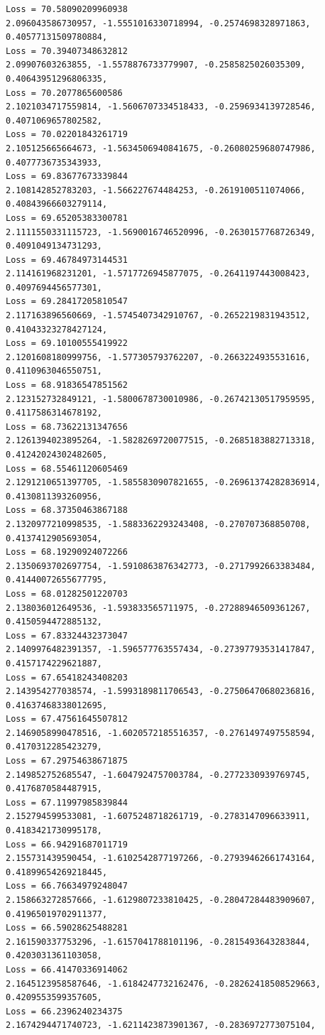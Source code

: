 \documentclass[11pt]{article}
\begin{document}
\begin{Verbatim}[commandchars=\\\{\}]
Loss = 70.58090209960938
2.096043586730957, -1.5551016330718994, -0.2574698328971863,
0.40577131509780884,
Loss = 70.39407348632812
2.09907603263855, -1.5578876733779907, -0.2585825026035309, 0.40643951296806335,
Loss = 70.2077865600586
2.1021034717559814, -1.5606707334518433, -0.2596934139728546,
0.4071069657802582,
Loss = 70.02201843261719
2.105125665664673, -1.5634506940841675, -0.26080259680747986,
0.4077736735343933,
Loss = 69.83677673339844
2.108142852783203, -1.566227674484253, -0.2619100511074066, 0.40843966603279114,
Loss = 69.65205383300781
2.1111550331115723, -1.5690016746520996, -0.2630157768726349,
0.4091049134731293,
Loss = 69.46784973144531
2.114161968231201, -1.5717726945877075, -0.2641197443008423, 0.4097694456577301,
Loss = 69.28417205810547
2.117163896560669, -1.5745407342910767, -0.2652219831943512,
0.41043323278427124,
Loss = 69.10100555419922
2.1201608180999756, -1.577305793762207, -0.2663224935531616, 0.4110963046550751,
Loss = 68.91836547851562
2.123152732849121, -1.5800678730010986, -0.26742130517959595,
0.4117586314678192,
Loss = 68.73622131347656
2.1261394023895264, -1.5828269720077515, -0.2685183882713318,
0.41242024302482605,
Loss = 68.55461120605469
2.1291210651397705, -1.5855830907821655, -0.26961374282836914,
0.4130811393260956,
Loss = 68.37350463867188
2.1320977210998535, -1.5883362293243408, -0.270707368850708, 0.4137412905693054,
Loss = 68.19290924072266
2.1350693702697754, -1.5910863876342773, -0.2717992663383484,
0.41440072655677795,
Loss = 68.01282501220703
2.138036012649536, -1.593833565711975, -0.27288946509361267, 0.4150594472885132,
Loss = 67.83324432373047
2.1409976482391357, -1.596577763557434, -0.27397793531417847,
0.4157174229621887,
Loss = 67.65418243408203
2.143954277038574, -1.5993189811706543, -0.27506470680236816,
0.41637468338012695,
Loss = 67.47561645507812
2.1469058990478516, -1.6020572185516357, -0.2761497497558594,
0.4170312285423279,
Loss = 67.29754638671875
2.149852752685547, -1.6047924757003784, -0.2772330939769745, 0.4176870584487915,
Loss = 67.11997985839844
2.152794599533081, -1.6075248718261719, -0.2783147096633911, 0.4183421730995178,
Loss = 66.94291687011719
2.155731439590454, -1.6102542877197266, -0.27939462661743164,
0.41899654269218445,
Loss = 66.76634979248047
2.158663272857666, -1.6129807233810425, -0.28047284483909607,
0.41965019702911377,
Loss = 66.59028625488281
2.161590337753296, -1.6157041788101196, -0.2815493643283844, 0.4203031361103058,
Loss = 66.41470336914062
2.1645123958587646, -1.6184247732162476, -0.28262418508529663,
0.4209553599357605,
Loss = 66.2396240234375
2.1674294471740723, -1.6211423873901367, -0.2836972773075104,

\end{Verbatim}
\end{document}
